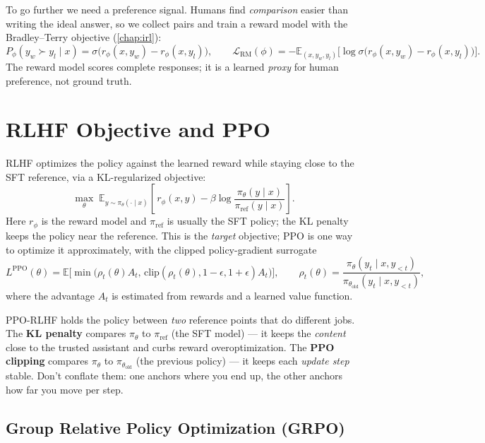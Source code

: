 \documentclass[11pt, oneside]{book}
\newcommand{\E}{\mathbb{E}}              %
\newcommand{\loss}{\mathcal{L}}          %
\newcommand{\params}{\boldsymbol{\theta}}   %
\begin{document}
To go further we need a preference signal. Humans find \emph{comparison} easier than writing
the ideal answer, so we collect pairs and train a reward model with the Bradley--Terry
objective (\cref{chap:irl}):
\[
  P_\phi(y_w \succ y_l\mid x) = \sigma\bigl(r_\phi(x, y_w) - r_\phi(x, y_l)\bigr),
  \qquad
  \loss_{\text{RM}}(\phi) = -\E_{(x,y_w,y_l)}\bigl[\log\sigma\bigl(r_\phi(x,y_w) - r_\phi(x,y_l)\bigr)\bigr].
\]
The reward model scores complete responses; it is a learned \emph{proxy} for human
preference, not ground truth.

\section{RLHF Objective and PPO}

RLHF optimizes the policy against the learned reward while staying close to the SFT
reference, via a KL-regularized objective:
\[
  \max_\theta\; \E_{y\sim\pi_\theta(\cdot\mid x)}\!\left[\,
    r_\phi(x, y) - \beta \log \frac{\pi_\theta(y\mid x)}{\pi_{\text{ref}}(y\mid x)}\right].
\]
Here $r_\phi$ is the reward model and $\pi_{\text{ref}}$ is usually the SFT policy; the KL
penalty keeps the policy near the reference. This is the \emph{target} objective; PPO is one
way to optimize it approximately, with the clipped policy-gradient surrogate
\[
  L^{\text{PPO}}(\theta) = \E\bigl[\min\bigl(\rho_t(\theta) A_t,\, \mathrm{clip}(\rho_t(\theta), 1-\epsilon, 1+\epsilon) A_t\bigr)\bigr],
  \qquad
  \rho_t(\theta) = \frac{\pi_\theta(y_t\mid x, y_{<t})}{\pi_{\theta_{\text{old}}}(y_t\mid x, y_{<t})},
\]
where the advantage $A_t$ is estimated from rewards and a learned value function.

\begin{intbox}[title={Two anchors in PPO-style RLHF}]
PPO-RLHF holds the policy between \emph{two} reference points that do different jobs. The
\textbf{KL penalty} compares $\pi_\theta$ to $\pi_{\text{ref}}$ (the SFT model) --- it keeps
the \emph{content} close to the trusted assistant and curbs reward overoptimization. The
\textbf{PPO clipping} compares $\pi_\theta$ to $\pi_{\theta_{\text{old}}}$ (the previous
policy) --- it keeps each \emph{update step} stable. Don't conflate them: one anchors where
you end up, the other anchors how far you move per step.
\end{intbox}

\subsection{Group Relative Policy Optimization (GRPO)}
\end{document}
